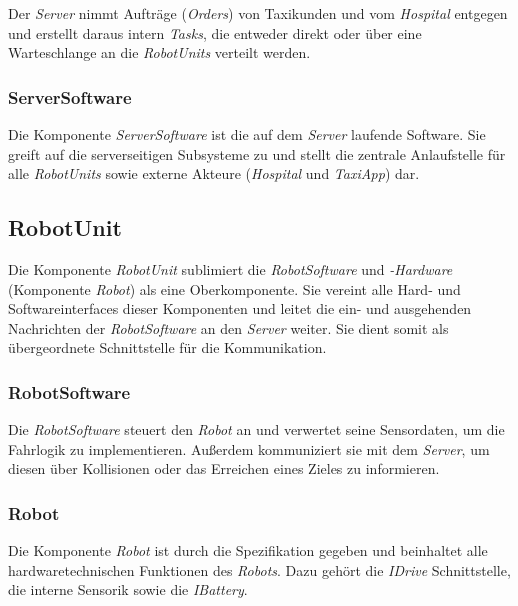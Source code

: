 Der \emph{Server} nimmt Aufträge (\emph{Orders}) von Taxikunden und vom \emph{Hospital} entgegen und erstellt daraus intern \emph{Tasks}, die entweder direkt oder über eine Warteschlange an die \emph{RobotUnits} verteilt werden.

\subsubsection{ServerSoftware}

Die Komponente \emph{ServerSoftware} ist die auf dem \emph{Server} laufende Software. 
Sie greift auf die serverseitigen Subsysteme zu und stellt die zentrale Anlaufstelle f\"{u}r alle \emph{RobotUnits} sowie externe Akteure (\emph{Hospital} und \emph{TaxiApp}) dar.

\subsection{RobotUnit}

Die Komponente \emph{RobotUnit} sublimiert die \emph{RobotSoftware} und \emph{-Hardware} (Komponente \emph{Robot}) als eine Oberkomponente. 
Sie vereint alle Hard- und Softwareinterfaces dieser Komponenten und leitet die ein- und ausgehenden Nachrichten der \emph{RobotSoftware} an den \emph{Server} weiter. 
Sie dient somit als \"{u}bergeordnete Schnittstelle f\"{u}r die Kommunikation.

\subsubsection{RobotSoftware}

Die \emph{RobotSoftware} steuert den \emph{Robot} an und verwertet seine Sensordaten, um die Fahrlogik zu implementieren. Außerdem kommuniziert sie mit dem \emph{Server}, um diesen über Kollisionen oder das Erreichen eines Zieles zu informieren.

\subsubsection{Robot}

Die Komponente \emph{Robot} ist durch die Spezifikation gegeben und beinhaltet alle hardwaretechnischen Funktionen des \emph{Robots}. 
Dazu geh\"{o}rt die \emph{IDrive} Schnittstelle, die interne Sensorik sowie die \emph{IBattery}.
